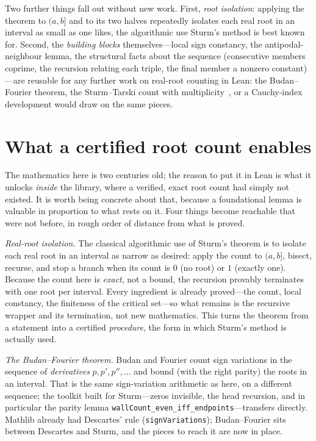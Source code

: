 \documentclass[11pt]{article}
\newcommand{\lean}[1]{\texttt{#1}}
\begin{document}
Two further things fall out without new work. First, \emph{root isolation}: applying the theorem to
$(a,b]$ and to its two halves repeatedly isolates each real root in an interval as small as one
likes, the algorithmic use Sturm's method is best known for. Second, the \emph{building blocks}
themselves---local sign constancy, the antipodal-neighbour lemma, the structural facts about the
sequence (consecutive members coprime, the recursion relating each triple, the final member a
nonzero constant)---are reusable for any further work on real-root counting in Lean: the
Budan--Fourier theorem, the Sturm--Tarski count with multiplicity~\cite{libudan}, or a Cauchy-index
development would draw on the same pieces.

\section{What a certified root count enables}\label{sec:enables}

The mathematics here is two centuries old; the reason to put it in Lean is what it unlocks
\emph{inside} the library, where a verified, exact root count had simply not existed. It is worth
being concrete about that, because a foundational lemma is valuable in proportion to what rests on
it. Four things become reachable that were not before, in rough order of distance from what is
proved.

\emph{Real-root isolation.} The classical algorithmic use of Sturm's theorem is to isolate each
real root in an interval as narrow as desired: apply the count to $(a,b]$, bisect, recurse, and
stop a branch when its count is $0$ (no root) or $1$ (exactly one). Because the count here is
\emph{exact}, not a bound, the recursion provably terminates with one root per interval. Every
ingredient is already proved---the count, local constancy, the finiteness of the critical
set---so what remains is the recursive wrapper and its termination, not new mathematics. This turns
the theorem from a statement into a certified \emph{procedure}, the form in which Sturm's method is
actually used.

\emph{The Budan--Fourier theorem.} Budan and Fourier count sign variations in the sequence of
\emph{derivatives} $p,p',p'',\dots$ and bound (with the right parity) the roots in an interval.
That is the same sign-variation arithmetic as here, on a different sequence; the toolkit built for
Sturm---zeros invisible, the head recursion, and in particular the parity lemma
\lean{wallCount\_even\_iff\_endpoints}---transfers directly. Mathlib already had Descartes' rule
(\lean{signVariations}); Budan--Fourier sits between Descartes and Sturm, and the pieces to reach
it are now in place.
\end{document}
